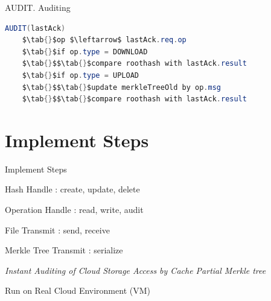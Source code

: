 \documentclass{beamer}
\newcommand{\RNum}[1]{\uppercase\expandafter{\romannumeral #1\relax}}
\newcommand{\tab}[1]{\hspace{.1\textwidth}\rlap{#1}}
\begin{document}
\begin{frame}[fragile]{AUDIT}{\RNum{3}. Auditing}
	\begin{center}
	\begin{minipage}{.8\hsize}
	\begin{lstlisting}[mathescape, language=Java, caption=Audit algorithm]
	AUDIT(lastAck)
	$\tab{}$op $\leftarrow$ lastAck.req.op
	$\tab{}$if op.type = DOWNLOAD
	$\tab{}$$\tab{}$compare roothash with lastAck.result
	$\tab{}$if op.type = UPLOAD
	$\tab{}$$\tab{}$update merkleTreeOld by op.msg
	$\tab{}$$\tab{}$compare roothash with lastAck.result
	\end{lstlisting}
	\end{minipage}
	\end{center}
\end{frame}

\section{Implement Steps}
\begin{frame}{Implement Steps}
	\begin{enumerate}
	{\color{blue}
	\item Hash Handle : create, update, delete
	\item Operation Handle : read, write, audit
	\item File Transmit : send, receive
	\item Merkle Tree Transmit : serialize}
	\item \alert{\it Instant Auditing of Cloud Storage Access by Cache Partial Merkle tree}
	\item Run on Real Cloud Environment (VM)
	\end{enumerate}
\end{frame}
\end{document}

